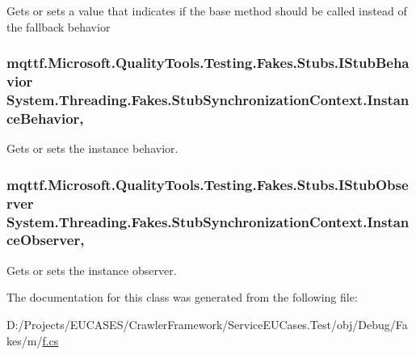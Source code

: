 Gets or sets a value that indicates if the base method should be called instead of the fallback behavior

\hypertarget{class_system_1_1_threading_1_1_fakes_1_1_stub_synchronization_context_a6e1e0620ee748d16c4fbbf8a1d49deac}{
\subsubsection[{Instance\-Behavior}]{\setlength{\rightskip}{0pt plus 5cm}mqttf.\-Microsoft.\-Quality\-Tools.\-Testing.\-Fakes.\-Stubs.\-I\-Stub\-Behavior System.\-Threading.\-Fakes.\-Stub\-Synchronization\-Context.\-Instance\-Behavior\hspace{0.3cm}{\ttfamily [get]}, {\ttfamily [set]}}}\label{class_system_1_1_threading_1_1_fakes_1_1_stub_synchronization_context_a6e1e0620ee748d16c4fbbf8a1d49deac}


Gets or sets the instance behavior.

\hypertarget{class_system_1_1_threading_1_1_fakes_1_1_stub_synchronization_context_adad410beea0464c94b2dc8a70beb41da}{
\subsubsection[{Instance\-Observer}]{\setlength{\rightskip}{0pt plus 5cm}mqttf.\-Microsoft.\-Quality\-Tools.\-Testing.\-Fakes.\-Stubs.\-I\-Stub\-Observer System.\-Threading.\-Fakes.\-Stub\-Synchronization\-Context.\-Instance\-Observer\hspace{0.3cm}{\ttfamily [get]}, {\ttfamily [set]}}}\label{class_system_1_1_threading_1_1_fakes_1_1_stub_synchronization_context_adad410beea0464c94b2dc8a70beb41da}


Gets or sets the instance observer.



The documentation for this class was generated from the following file\-:\begin{DoxyCompactItemize}
\item 
D\-:/\-Projects/\-E\-U\-C\-A\-S\-E\-S/\-Crawler\-Framework/\-Service\-E\-U\-Cases.\-Test/obj/\-Debug/\-Fakes/m/\hyperlink{m_2f_8cs}{f.\-cs}\end{DoxyCompactItemize}
